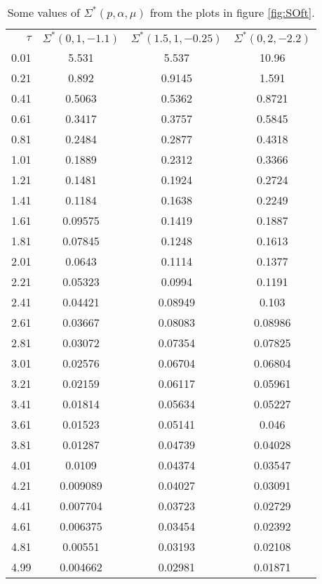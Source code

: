 \begin{table}[H]
	\begin{center}
		\begin{tabular}{r | c | c | c} 
		 	$ \tau $ & $ \Sigma^*(0, 1, -1.1) $ & $ \Sigma^*(1.5, 1, -0.25) $ & $ \Sigma^*(0, 2, -2.2) $ \\ 
		 	\specialrule{.1em}{.05em}{.05em} 
0.01 & 5.531 & 5.537 & 10.96 \\
0.21 & 0.892 & 0.9145 & 1.591 \\
0.41 & 0.5063 & 0.5362 & 0.8721 \\
0.61 & 0.3417 & 0.3757 & 0.5845 \\
0.81 & 0.2484 & 0.2877 & 0.4318 \\
1.01 & 0.1889 & 0.2312 & 0.3366 \\
1.21 & 0.1481 & 0.1924 & 0.2724 \\
1.41 & 0.1184 & 0.1638 & 0.2249 \\
1.61 & 0.09575 & 0.1419 & 0.1887 \\
1.81 & 0.07845 & 0.1248 & 0.1613 \\
2.01 & 0.0643 & 0.1114 & 0.1377 \\
2.21 & 0.05323 & 0.0994 & 0.1191 \\
2.41 & 0.04421 & 0.08949 & 0.103 \\
2.61 & 0.03667 & 0.08083 & 0.08986 \\
2.81 & 0.03072 & 0.07354 & 0.07825 \\
3.01 & 0.02576 & 0.06704 & 0.06804 \\
3.21 & 0.02159 & 0.06117 & 0.05961 \\
3.41 & 0.01814 & 0.05634 & 0.05227 \\
3.61 & 0.01523 & 0.05141 & 0.046 \\
3.81 & 0.01287 & 0.04739 & 0.04028 \\
4.01 & 0.0109 & 0.04374 & 0.03547 \\
4.21 & 0.009089 & 0.04027 & 0.03091 \\
4.41 & 0.007704 & 0.03723 & 0.02729 \\
4.61 & 0.006375 & 0.03454 & 0.02392 \\
4.81 & 0.00551 & 0.03193 & 0.02108 \\
4.99 & 0.004662 & 0.02981 & 0.01871 \\
		\end{tabular}
	\end{center}
	\caption{Some values of $ \Sigma^*(p, \alpha, \mu) $ from the plots in figure \ref{fig:SOft}.}
	\label{tab:truthTables}   
\end{table}

